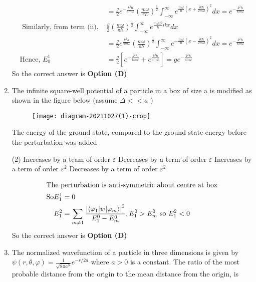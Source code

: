 \begin{enumerate}
\begin{answer}
\begin{align*}
&=\frac{g}{2} e^{-\frac{k^{2} \hbar}{4 m \omega}}\left(\frac{m \omega}{\pi \hbar}\right)^{\frac{1}{2}} \int_{-\infty}^{\infty} e^{\frac{m \omega}{\hbar}\left(x+\frac{i k \hbar}{2 m \omega}\right)^{2}} d x=e^{-\frac{k^{2} \hbar}{4 m \omega}}\\
\text{	Similarly, from term (ii), }&\frac{g}{2}\left(\frac{m \omega}{\pi \hbar}\right)^{\frac{1}{2}} \int_{-\infty}^{\infty} e^{\frac{m \omega x^{2}}{\hbar} i k x} d x\\
&=\frac{g}{2} e^{\frac{k^{2} h}{4 m \omega}}\left(\frac{m \omega}{\pi \hbar}\right)^{\frac{1}{2}} \int_{-\infty}^{\infty} e^{-\frac{m \omega}{\hbar}\left(x-\frac{i k \hbar}{2 m \omega}\right)^{2}} d x=e^{-\frac{k^{2} \hbar}{4 m \omega}}\\
\text{Hence, }E_{0}^{1}&=\frac{g}{2}\left[e^{-\frac{k^{2} \hbar}{4 m \omega}}+e^{\frac{k^{2} \hbar}{4 m \omega}}\right]=g e^{-\frac{k^{2} \hbar}{4 m \omega}}
\end{align*}
So the correct answer is \textbf{Option (D)}
\end{answer}
\item The infinite square-well potential of a particle in a box of size a is modified as shown in the figure below (assume $\Delta<<a$ )\\
\begin{figure}[H]
	\centering
	\texttt{[image: diagram-20211027(1)-crop]}
\end{figure}
The energy of the ground state, compared to the ground state energy before the perturbation was added
{}
\begin{tasks}(2)
\task[\textbf{A.}] Increases by a team of order $\varepsilon$
\task[\textbf{B.}] Decreases by a term of order $\varepsilon$
\task[\textbf{C.}] Increases by a term of order $\varepsilon^{2}$
\task[\textbf{D.}] Decreases by a term of order $\varepsilon^{2}$
\end{tasks}
\begin{answer}
\begin{align*}
\intertext{The perturbation is anti-symmetric about centre at box}
\mathrm{So} E_{1}^{1}&=0\\
E_{1}^{2}&=\sum_{m \neq 1} \frac{\left|\left\langle\varphi_{1}|w| \varphi_{m}\right\rangle\right|^{2}}{E_{1}^{0}-E_{m}^{0}}, E_{1}^{0}>E_{m}^{0}\text{ so } E_{1}^{2}<0
\end{align*}
So the correct answer is \textbf{Option (D)}
\end{answer}
\item The normalized wavefunction of a particle in three dimensions is given by $\psi(r, \theta, \varphi)=\frac{1}{\sqrt{8 \pi a^{3}}} e^{-r / 2 a}$ where $a>0$ is a constant. The ratio of the most probable distance from the origin to the mean distance from the origin, is

\end{enumerate}
